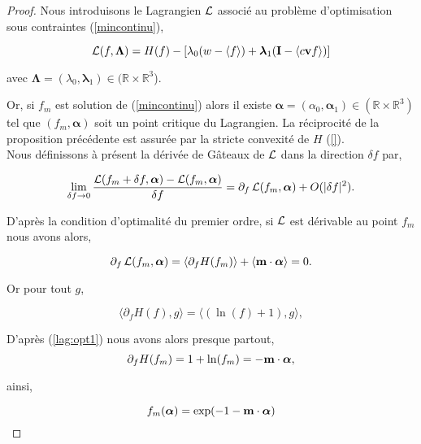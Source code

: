 \begin{proof}
  Nous introduisons le Lagrangien $\operatorname{\mathcal{L}}$ associé au problème d'optimisation 
  sous contraintes (\ref{mincontinu}),

  \begin{equation}
    \operatorname{\mathcal{L}}(f, \bm{\Lambda}) = H(f) - \left[\lambda_0 (w - \langle f \rangle) 
    + \bm{\lambda}_1 (\mathbf{I} - \langle c\mathbf{v} f \rangle) \right]
  \end{equation}

  avec $\bm{\Lambda} = (\lambda_0, \bm{\lambda}_1) \in 
  (\mathbb{R} \times \mathbb{R}^3$).

  Or, si $f_m$ est solution de (\ref{mincontinu}) alors il existe
  $\bm{\alpha} = (\alpha_0, \bm{\alpha}_1) \in  (\mathbb{R} \times 
  \mathbb{R}^3)$   
  tel que $(f_m,\bm{\alpha})$ soit un point critique du Lagrangien.  
  La réciprocité de la proposition précédente est assurée par la stricte 
  convexité de $H$ (\ref{}). \\
    
  Nous définissons à présent la dérivée de Gâteaux de $\operatorname{\mathcal{L}}$ dans la direction 
  $\delta f$ par,

  $$ 
    \lim\limits_{\delta f \to 0} \frac{ \operatorname{\mathcal{L}}(f_m + \delta f,\bm{\alpha})
     - \operatorname{\mathcal{L}}(f_m,\bm{\alpha})}{\delta f} =  \partial_f \operatorname{\mathcal{L}}(f_m,\bm{\alpha})
     + O(|\delta f|^2).
  $$

  D'après la condition d'optimalité du premier ordre, si $\operatorname{\mathcal{L}}$ est 
  dérivable au point $f_m$ nous avons alors,  

  \begin{equation}
   \label{lag:opt1}
    \partial_f \operatorname{\mathcal{L}}(f_m,\bm{\alpha}) = \langle \partial_f H(f_m) \rangle 
    + \langle \mathbf{m} \cdot \bm{\alpha} \rangle = 0.
  \end{equation}

  Or pour tout $g$, 
  
  $$
  \langle \partial_f H(f), g \rangle = \langle (\ln(f) + 1),g \rangle,
  $$
  
  D'après (\ref{lag:opt1}) nous avons alors presque partout,
  \begin{equation}
  \label{derH}
    \partial_f H(f_m)  = 1 + \ln(f_m) =  - \mathbf{m} \cdot \bm{\alpha},
  \end{equation}

  ainsi,

  $$
    f_m(\bm{\alpha}) = \exp( - 1 - \mathbf{m} \cdot \bm{\alpha} )
  $$
  
\end{proof}


